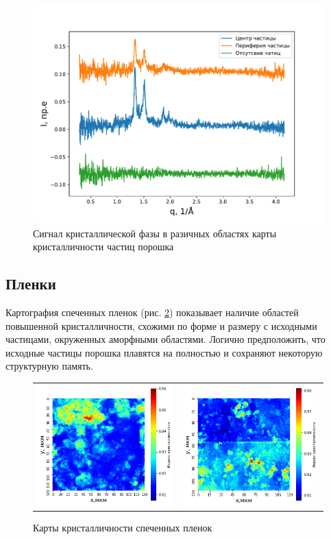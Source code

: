 \begin{figure}[h!]
 
    \includegraphics[width = \linewidth]{fig/var-profile.pdf}
    \caption{Сигнал кристаллической фазы в разичных областях карты кристалличности частиц порошка}
    \label{fig:var-profile}
\end{figure}

\subsection{Пленки}

Картография спеченных пленок (рис. \ref{fig:maps-filmr}) показывает наличие областей повышенной кристалличности, схожими по форме и размеру с исходными частицами, окруженных аморфными областями. Логично предположить, что исходные частицы порошка плавятся на полностью и сохраняют некоторую структурную память. 

		\begin{figure}[h]
\begin{tabular}{cc}
\includegraphics[width=0.5\linewidth]{fig/72map.png}
&
\includegraphics[width=0.5\linewidth]{fig/map71.png} \\
\end{tabular}
\caption{Карты кристалличности спеченных пленок}
\label{fig:maps-filmr}
\end{figure}
	
	

